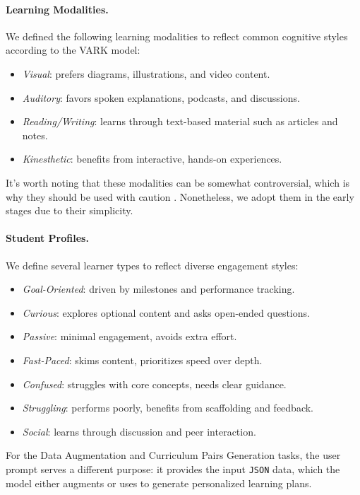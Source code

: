 \paragraph{Learning Modalities.}  
We defined the following learning modalities to reflect common cognitive styles according to the VARK model:

{\small
\begin{itemize}
    \item \textit{Visual}: prefers diagrams, illustrations, and video content.
    \item \textit{Auditory}: favors spoken explanations, podcasts, and discussions.
    \item \textit{Reading/Writing}: learns through text-based material such as articles and notes.
    \item \textit{Kinesthetic}: benefits from interactive, hands-on experiences.
\end{itemize}
}

It's worth noting that these modalities can be somewhat controversial, which is why they should be used with caution \cite{vark-casestudy}. Nonetheless, we adopt them in the early stages due to their simplicity.

\paragraph{Student Profiles.}  
We define several learner types to reflect diverse engagement styles:

{\small
\begin{itemize}
\item \textit{Goal-Oriented}: driven by milestones and performance tracking.
\item \textit{Curious}: explores optional content and asks open-ended questions.
\item \textit{Passive}: minimal engagement, avoids extra effort.
\item \textit{Fast-Paced}: skims content, prioritizes speed over depth.
\item \textit{Confused}: struggles with core concepts, needs clear guidance.
\item \textit{Struggling}: performs poorly, benefits from scaffolding and feedback.
\item \textit{Social}: learns through discussion and peer interaction.
\end{itemize}
}

For the Data Augmentation and Curriculum Pairs Generation tasks, the user prompt serves a different purpose: it provides the input \texttt{JSON} data, which the model either augments or uses to generate personalized learning plans.


